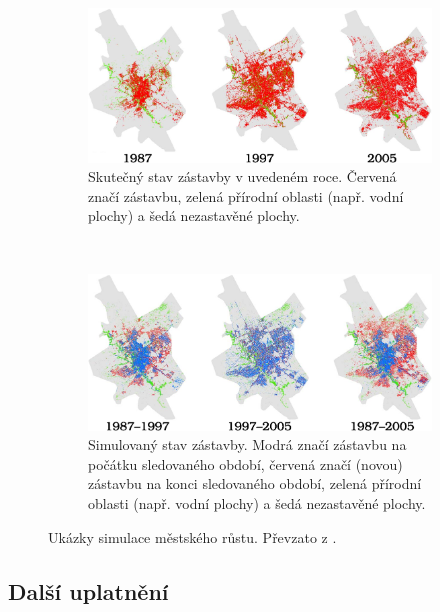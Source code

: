 \begin{figure}
    \begin{subfigure}[t]{\textwidth}
      \includegraphics[width=\textwidth]{genimg-urban-growt-city-1}
      \caption{Skutečný stav zástavby v uvedeném roce. Červená značí zástavbu, zelená přírodní oblasti (např. vodní plochy) a šedá nezastavěné plochy.} 
    \end{subfigure}
    \\
    \begin{subfigure}[t]{\textwidth} \centering
      \includegraphics[width=\textwidth]{genimg-urban-growt-city-2}
      \caption{Simulovaný stav zástavby. Modrá značí zástavbu na počátku sledovaného období, červená značí (novou) zástavbu na konci sledovaného období, zelená přírodní oblasti (např. vodní plochy) a šedá nezastavěné plochy.} 
    \end{subfigure}

    \caption[Ukázky simulace městského růstu]{Ukázky simulace městského růstu. Převzato z \cite{Ahm+-CalFuzCelAutModUrbDynSauAr}.} \label{img:UrbGroProSample}
\end{figure}

\subsection{Další uplatnění}


